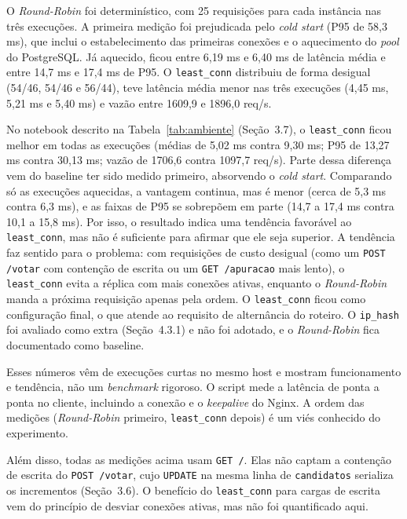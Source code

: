 \documentclass[12pt,a4paper]{article}
\begin{document}
O \textit{Round-Robin} foi determinístico, com 25 requisições para cada instância nas três execuções. A primeira medição foi prejudicada pelo \textit{cold start} (P95 de 58,3 ms), que inclui o estabelecimento das primeiras conexões e o aquecimento do \textit{pool} do PostgreSQL. Já aquecido, ficou entre 6,19 ms e 6,40 ms de latência média e entre 14,7 ms e 17,4 ms de P95. O \texttt{least\_conn} distribuiu de forma desigual (54/46, 54/46 e 56/44), teve latência média menor nas três execuções (4,45 ms, 5,21 ms e 5,40 ms) e vazão entre 1609,9 e 1896,0 req/s.

No notebook descrito na Tabela~\ref{tab:ambiente} (Seção~3.7), o \texttt{least\_conn} ficou melhor em todas as execuções (médias de 5,02 ms contra 9,30 ms; P95 de 13,27 ms contra 30,13 ms; vazão de 1706,6 contra 1097,7 req/s). Parte dessa diferença vem do baseline ter sido medido primeiro, absorvendo o \textit{cold start}. Comparando só as execuções aquecidas, a vantagem continua, mas é menor (cerca de 5,3 ms contra 6,3 ms), e as faixas de P95 se sobrepõem em parte (14,7 a 17,4 ms contra 10,1 a 15,8 ms). Por isso, o resultado indica uma tendência favorável ao \texttt{least\_conn}, mas não é suficiente para afirmar que ele seja superior. A tendência faz sentido para o problema: com requisições de custo desigual (como um \texttt{POST /votar} com contenção de escrita ou um \texttt{GET /apuracao} mais lento), o \texttt{least\_conn} evita a réplica com mais conexões ativas, enquanto o \textit{Round-Robin} manda a próxima requisição apenas pela ordem. O \texttt{least\_conn} ficou como configuração final, o que atende ao requisito de alternância do roteiro. O \texttt{ip\_hash} foi avaliado como extra (Seção~4.3.1) e não foi adotado, e o \textit{Round-Robin} fica documentado como baseline.

Esses números vêm de execuções curtas no mesmo host e mostram funcionamento e tendência, não um \textit{benchmark} rigoroso. O script mede a latência de ponta a ponta no cliente, incluindo a conexão e o \textit{keepalive} do Nginx. A ordem das medições (\textit{Round-Robin} primeiro, \texttt{least\_conn} depois) é um viés conhecido do experimento.

Além disso, todas as medições acima usam \texttt{GET /}. Elas não captam a contenção de escrita do \texttt{POST /votar}, cujo \texttt{UPDATE} na mesma linha de \texttt{candidatos} serializa os incrementos (Seção~3.6). O benefício do \texttt{least\_conn} para cargas de escrita vem do princípio de desviar conexões ativas, mas não foi quantificado aqui.
\end{document}

